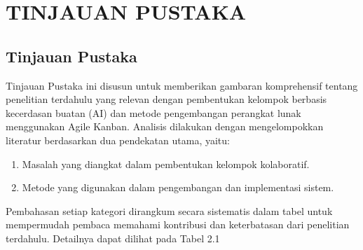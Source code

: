 \chapter{TINJAUAN PUSTAKA} \label{Bab II}

\section{Tinjauan Pustaka} \label{II.Tinjauan}
Tinjauan Pustaka ini disusun untuk memberikan gambaran komprehensif tentang
penelitian terdahulu yang relevan dengan pembentukan kelompok berbasis
kecerdasan buatan (AI) dan metode pengembangan perangkat lunak menggunakan
Agile Kanban. Analisis dilakukan dengan mengelompokkan literatur berdasarkan
dua pendekatan utama, yaitu:
\begin{enumerate}[noitemsep]
	\item Masalah yang diangkat dalam pembentukan kelompok kolaboratif.
	\item Metode yang digunakan dalam pengembangan dan implementasi sistem.
\end{enumerate}
Pembahasan setiap kategori dirangkum secara sistematis dalam tabel untuk
mempermudah pembaca memahami kontribusi dan keterbatasan dari penelitian terdahulu. Detailnya dapat dilihat pada Tabel 2.1

